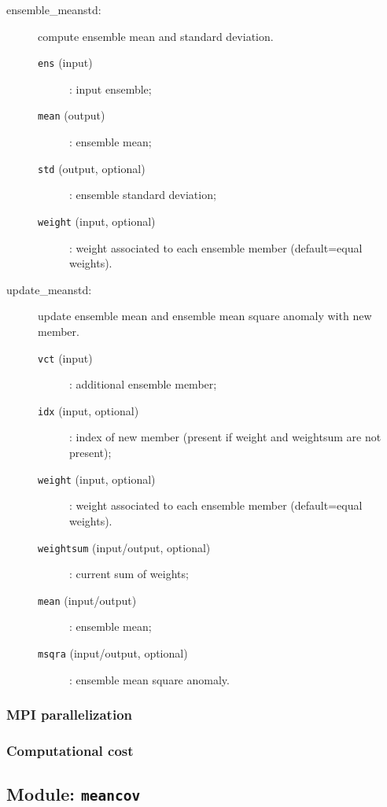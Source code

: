 \documentclass[11pt]{article}
\begin{document}
\begin{description}
\item[ensemble\_meanstd:] compute ensemble mean and standard deviation.
  \begin{description}
  \item[{\tt ens} (input)]: input ensemble;
  \item[{\tt mean} (output)]: ensemble mean;
  \item[{\tt std} (output, optional)]: ensemble standard deviation;
  \item[{\tt weight} (input, optional)]: weight associated to each ensemble member
                                         (default=equal weights).
  \end{description}
\item[update\_meanstd:] update ensemble mean and ensemble mean square anomaly with new member.
  \begin{description}
  \item[{\tt vct} (input)]: additional ensemble member;
  \item[{\tt idx} (input, optional)]: index of new member
                                      (present if weight and weightsum are not present);
  \item[{\tt weight} (input, optional)]: weight associated to each ensemble member
                                         (default=equal weights).
  \item[{\tt weightsum} (input/output, optional)]: current sum of weights;
  \item[{\tt mean} (input/output)]: ensemble mean;
  \item[{\tt msqra} (input/output, optional)]: ensemble mean square anomaly.
  \end{description}
\end{description}

\subsubsection*{MPI parallelization}

\subsubsection*{Computational cost}

\subsection{Module: {\tt\bf meancov}}
\end{document}
